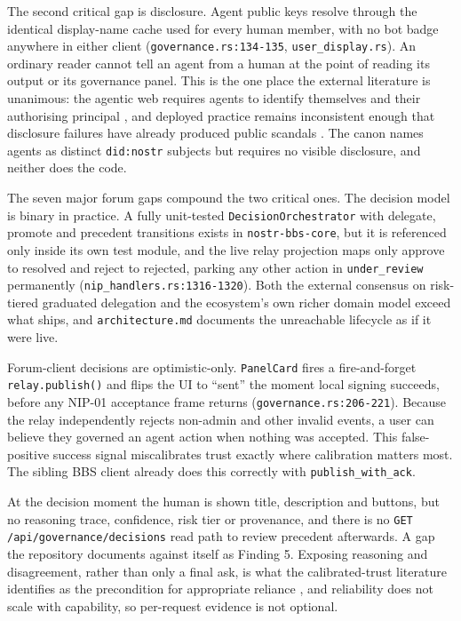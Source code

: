 The second critical gap is disclosure. Agent public keys resolve through the identical display-name cache used for every human member, with no bot badge anywhere in either client (\texttt{governance.rs:134-135}, \texttt{user\_display.rs}). An ordinary reader cannot tell an agent from a human at the point of reading its output or its governance panel. This is the one place the external literature is unanimous: the agentic web requires agents to identify themselves and their authorising principal \parencite{AgenticWebNorms2026}, and deployed practice remains inconsistent enough that disclosure failures have already produced public scandals \parencite{AgentIndex2025}. The canon names agents as distinct \texttt{did:nostr} subjects but requires no visible disclosure, and neither does the code.

The seven major forum gaps compound the two critical ones. The decision model is binary in practice. A fully unit-tested \texttt{DecisionOrchestrator} with delegate, promote and precedent transitions exists in \texttt{nostr-bbs-core}, but it is referenced only inside its own test module, and the live relay projection maps only approve to resolved and reject to rejected, parking any other action in \texttt{under\_review} permanently (\texttt{nip\_handlers.rs:1316-1320}). Both the external consensus on risk-tiered graduated delegation \parencite{Tomasev2026Delegation} and the ecosystem's own richer domain model exceed what ships, and \texttt{architecture.md} documents the unreachable lifecycle as if it were live.

Forum-client decisions are optimistic-only. \texttt{PanelCard} fires a fire-and-forget \texttt{relay.publish()} and flips the UI to ``sent'' the moment local signing succeeds, before any NIP-01 acceptance frame returns (\texttt{governance.rs:206-221}). Because the relay independently rejects non-admin and other invalid events, a user can believe they governed an agent action when nothing was accepted. This false-positive success signal miscalibrates trust exactly where calibration matters most. The sibling BBS client already does this correctly with \texttt{publish\_with\_ack}.

At the decision moment the human is shown title, description and buttons, but no reasoning trace, confidence, risk tier or provenance, and there is no \texttt{GET /api/governance/decisions} read path to review precedent afterwards. A gap the repository documents against itself as Finding 5. Exposing reasoning and disagreement, rather than only a final ask, is what the calibrated-trust literature identifies as the precondition for appropriate reliance \parencite{TrustingTeammates2025}, and reliability does not scale with capability, so per-request evidence is not optional.

